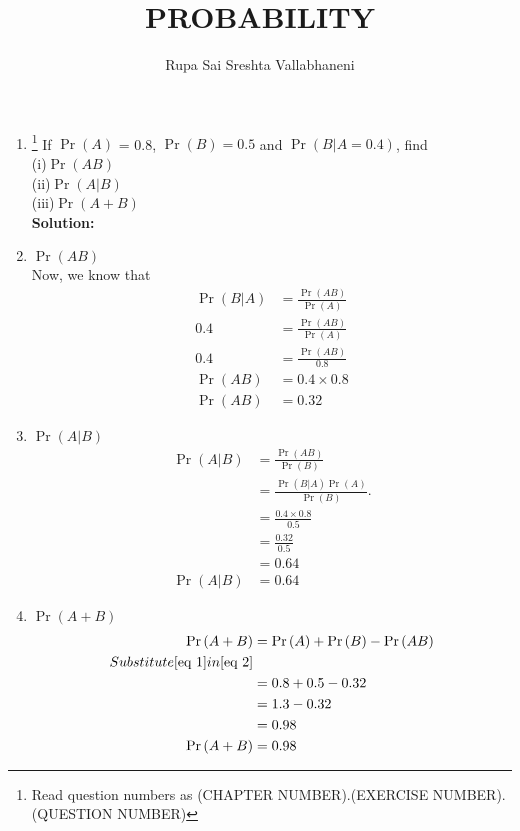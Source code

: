 \documentclass{article}
\newcommand{\solution}{\noindent \textbf{Solution: }}
\providecommand{\pr}[1]{\ensuremath{\Pr\left(#1\right)}}
\begin{document}
\title{PROBABILITY}
\author{\Large Rupa Sai Sreshta Vallabhaneni}
\date{}

\maketitle
\begin{enumerate}[label=13.\arabic{enumi}.\arabic{enumii}]%
\setcounter{enumi}{0}
\setcounter{enumii}{3}

\item \footnote{Read question numbers as (CHAPTER NUMBER).(EXERCISE NUMBER).(QUESTION NUMBER)}  If $\pr{A}$ = 0.8, $\pr{B} = 0.5$ and $\pr{B \vert A = 0.4}$, find  \\
(i)$\pr{AB}$ 
\\
 (ii)$\pr{A \vert B}$
\\
 (iii)$\pr{A+B}$
\\[1ex]

\solution
\item $\pr{AB}$
 \\
  Now, we know that
 \begin{align}
\pr{B \vert A} &= \frac{\pr{AB}}{\pr{A}}
 \\
 0.4 &= \frac{\pr{AB}}{\pr{A}}
 \\
 0.4 &= \frac{\pr{AB}}{0.8}
 \\
 \pr{AB} &= 0.4 \times 0.8
 \\
 \pr{AB} &= 0.32
 \label{eq 1}
 \end{align}
 \item
 $\pr{A \vert B}$
 \begin{align}
 \pr{A \vert B} &= \frac{\pr{AB}}{\pr{B}}
 \\
 &= \frac{\pr{ B \vert A}\pr{A}}{\pr{B}}.
 \\
  &= \frac{0.4 \times 0.8}{0.5}
 \\
 &= \frac{0.32}{0.5}
 \\
 &= 0.64
 \\
\pr{A \vert B} &= 0.64
 \end{align}
 \item
  $\pr{A+B}$
 \begin{align}
 \pr{A+B} &= \pr{A}+\pr{B}-\pr{AB} 
 \label{eq 2}
 \\
 Substitute \eqref{eq 1}  in \eqref{eq 2}
 \\
 &=0.8+0.5-0.32
 \\
 &=1.3-0.32
 \\
 &= 0.98
 \\
 \pr{A+B} &= 0.98
 \end{align}
\end{enumerate}
\end{document}
